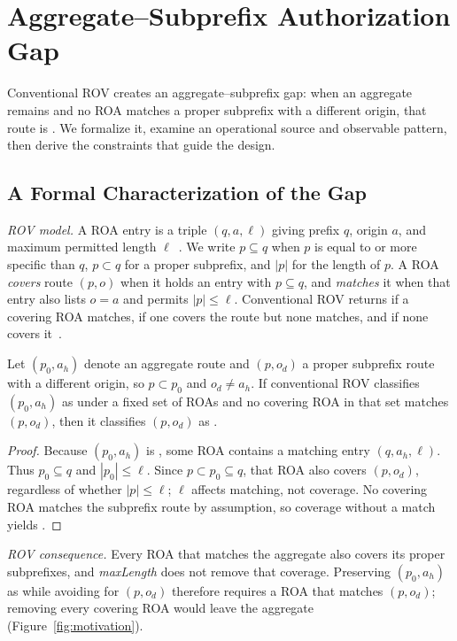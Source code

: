 \section{Aggregate--Subprefix Authorization Gap}
\label{sec:background}

Conventional ROV creates an aggregate--subprefix gap: when an aggregate remains \valid{} and no ROA matches a proper subprefix with a different origin, that route is \invalid{}. We formalize it, examine an operational source and observable pattern, then derive the constraints that guide the design.

\subsection{A Formal Characterization of the Gap}
\label{sec:formal-dilemma}

\emph{ROV model.} A ROA entry is a triple $(q,a,\ell)$ giving prefix $q$, origin $a$, and maximum permitted length $\ell$~\cite{rfc6480,rfc9582}. We write $p\subseteq q$ when $p$ is equal to or more specific than $q$, $p\subset q$ for a proper subprefix, and $|p|$ for the length of $p$. A ROA \emph{covers} route $(p,o)$ when it holds an entry with $p\subseteq q$, and \emph{matches} it when that entry also lists $o=a$ and permits $|p|\leq\ell$. Conventional ROV returns \valid{} if a covering ROA matches, \invalid{} if one covers the route but none matches, and \notfound{} if none covers it~\cite{rfc6811,rfc8481}.

\begin{proposition}
\label{prop:aggregate-subprefix-dilemma}
Let $(p_0,a_h)$ denote an aggregate route and $(p,o_d)$ a proper subprefix route with a different origin, so $p\subset p_0$ and $o_d\neq a_h$. If conventional ROV classifies $(p_0,a_h)$ as \valid{} under a fixed set of ROAs and no covering ROA in that set matches $(p,o_d)$, then it classifies $(p,o_d)$ as \invalid{}.
\end{proposition}
\begin{proof}
Because $(p_0,a_h)$ is \valid{}, some ROA contains a matching entry $(q,a_h,\ell)$. Thus $p_0\subseteq q$ and $|p_0|\leq\ell$. Since $p\subset p_0\subseteq q$, that ROA also covers $(p,o_d)$, regardless of whether $|p|\leq\ell$; $\ell$ affects matching, not coverage. No covering ROA matches the subprefix route by assumption, so coverage without a match yields \invalid{}.
\end{proof}

\emph{ROV consequence.} Every ROA that matches the aggregate also covers its proper subprefixes, and \emph{maxLength} does not remove that coverage. Preserving $(p_0,a_h)$ as \valid{} while avoiding \invalid{} for $(p,o_d)$ therefore requires a ROA that matches $(p,o_d)$; removing every covering ROA would leave the aggregate \notfound{} (Figure~\ref{fig:motivation}).

